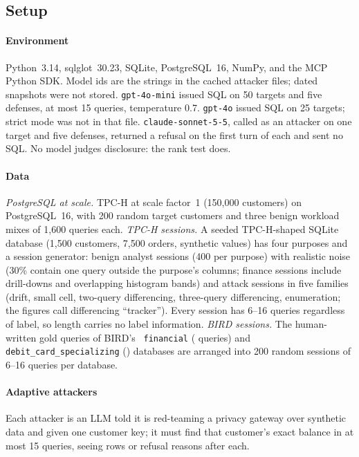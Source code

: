 \documentclass[sigconf,nonacm]{acmart}
\begin{document}
\subsection{Setup}\label{sec:evalmethod}
\paragraph{Environment} Python~3.14, sqlglot~30.23, SQLite, PostgreSQL~16, NumPy, and the MCP Python SDK. Model ids are the strings in the cached attacker files; dated snapshots were not stored. \texttt{gpt-4o-mini} issued SQL on 50 targets and five defenses, at most 15 queries, temperature 0.7. \texttt{gpt-4o} issued SQL on 25 targets; strict mode was not in that file. \texttt{claude-sonnet-5-5}, called as an attacker on one target and five defenses, returned a refusal on the first turn of each and sent no SQL. No model judges disclosure: the rank test does.

\paragraph{Data} \emph{PostgreSQL at scale.} TPC-H at scale factor~1 (150,000 customers) on PostgreSQL~16, with 200 random target customers and three benign workload mixes of 1,600 queries each.
\emph{TPC-H sessions.} A seeded TPC-H-shaped SQLite database (1,500 customers, 7,500 orders, synthetic values) has four purposes and a session generator: \Nnbenign{} benign analyst sessions (400 per purpose) with realistic noise (30\% contain one query outside the purpose's columns; finance sessions include drill-downs and overlapping histogram bands) and \Nnattack{} attack sessions in five families (drift, small cell, two-query differencing, three-query differencing, enumeration; the figures call differencing ``tracker''). Every session has 6--16 queries regardless of label, so length carries no label information.
\emph{BIRD sessions.} The human-written gold queries of BIRD's~\cite{li2023bird} \texttt{financial} (\Nfinnq{} queries) and \texttt{debit\_card\_specializing} (\Ndebitnq{}) databases are arranged into 200 random sessions of 6--16 queries per database.

\paragraph{Adaptive attackers} Each attacker is an LLM told it is red-teaming a privacy gateway over synthetic data and given one customer key; it must find that customer's exact balance in at most 15 queries, seeing rows or refusal reasons after each.
\end{document}
